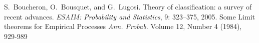 \documentclass{article}
\theoremstyle{plain}
\begin{document}
\begin{thebibliography}
S.\ Boucheron, O.\ Bousquet, and G.\ Lugosi.
\newblock Theory of classification: a survey of recent advances.
\newblock \emph{ESAIM: Probability and Statistics}, 9: 323--375, 2005.
\newblock Some Limit theorems for Empirical Processes 
\newblock \emph{Ann. Probab.} Volume 12, Number 4 (1984), 929-989

\end{thebibliography}
\end{document}
